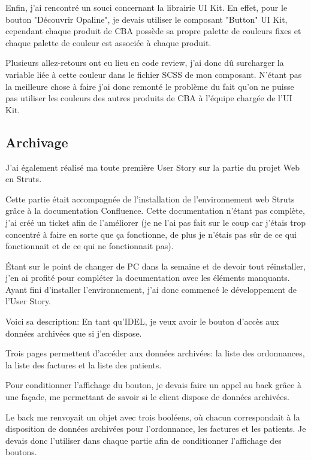 \documentclass{article}
\begin{document}
Enfin, j'ai rencontré un souci concernant la librairie UI Kit. En effet, pour le bouton "Découvrir Opaline", je devais utiliser le composant "Button" UI Kit, cependant chaque produit de CBA possède sa propre palette de couleurs fixes et chaque palette de couleur est associée à chaque produit.

Plusieurs allez-retours ont eu lieu en code review, j'ai donc dû surcharger la variable liée à cette couleur dans le fichier SCSS de mon composant. N'étant pas la meilleure chose à faire j'ai donc remonté le problème du fait qu'on ne puisse pas utiliser les couleurs des autres produits de CBA à l'équipe chargée de l'UI Kit. 

\subsection{Archivage}

J'ai également réalisé ma toute première User Story sur la partie du projet Web en Struts.

Cette partie était accompagnée de l'installation de l'environnement web Struts grâce à la documentation Confluence. 
Cette documentation n'étant pas complète, j'ai créé un ticket afin de l'améliorer (je ne l'ai pas fait sur le coup car j'étais trop concentré à faire en sorte que ça fonctionne, de plus je n'étais pas sûr de ce qui fonctionnait et de ce qui ne fonctionnait pas).

Étant sur le point de changer de PC dans la semaine et de devoir tout réinstaller, j'en ai profité pour compléter la documentation avec les éléments manquants. \\

Ayant fini d'installer l'environnement, j'ai donc commencé le développement de l'User Story.

Voici sa description: En tant qu'IDEL, je veux avoir le bouton d'accès aux données archivées que si j'en dispose.

Trois pages permettent d'accéder aux données archivées: la liste des ordonnances, la liste des factures et la liste des patients.

Pour conditionner l'affichage du bouton, je devais faire un appel au back grâce à une façade, me permettant de savoir si le client dispose de données archivées.

Le back me renvoyait un objet avec trois booléens, où chacun correspondait à la disposition de données archivées pour l'ordonnance, les factures et les patients. Je devais donc l'utiliser dans chaque partie afin de conditionner l'affichage des boutons.
\end{document}
